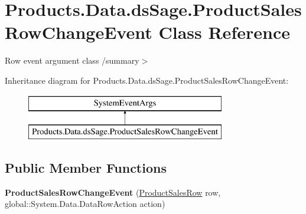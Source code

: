 \hypertarget{class_products_1_1_data_1_1ds_sage_1_1_product_sales_row_change_event}{}\section{Products.\+Data.\+ds\+Sage.\+Product\+Sales\+Row\+Change\+Event Class Reference}
\label{class_products_1_1_data_1_1ds_sage_1_1_product_sales_row_change_event}


Row event argument class /summary$>$  


Inheritance diagram for Products.\+Data.\+ds\+Sage.\+Product\+Sales\+Row\+Change\+Event\+:\begin{figure}[H]
\begin{center}
\leavevmode
\includegraphics[height=2.000000cm]{class_products_1_1_data_1_1ds_sage_1_1_product_sales_row_change_event}
\end{center}
\end{figure}
\subsection*{Public Member Functions}
\begin{DoxyCompactItemize}
\item 
{\bfseries Product\+Sales\+Row\+Change\+Event} (\hyperlink{class_products_1_1_data_1_1ds_sage_1_1_product_sales_row}{Product\+Sales\+Row} row, global\+::\+System.\+Data.\+Data\+Row\+Action action)\hypertarget{class_products_1_1_data_1_1ds_sage_1_1_product_sales_row_change_event_a06fdd79b4e9888c6850e713ff30a195d}{}\label{class_products_1_1_data_1_1ds_sage_1_1_product_sales_row_change_event_a06fdd79b4e9888c6850e713ff30a195d}

\end{DoxyCompactItemize}
